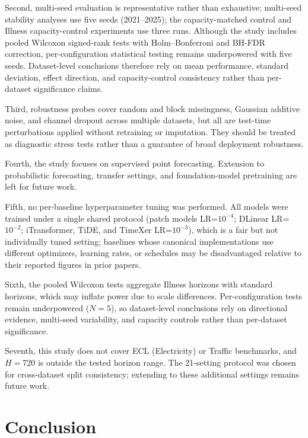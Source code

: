\documentclass{ieeeaccess}
\begin{document}
Second, multi-seed evaluation is representative rather than exhaustive:
multi-seed stability analyses use five seeds (2021--2025); the capacity-matched control
and Illness capacity-control experiments use three runs. Although the study includes
pooled Wilcoxon signed-rank tests with Holm--Bonferroni and BH-FDR correction,
per-configuration statistical testing remains underpowered with five seeds.
Dataset-level conclusions therefore rely on mean performance, standard deviation,
effect direction, and capacity-control consistency rather than per-dataset
significance claims.

Third, robustness probes cover random and block missingness, Gaussian additive noise,
and channel dropout across multiple datasets, but all are test-time perturbations
applied without retraining or imputation. They should be treated as diagnostic stress
tests rather than a guarantee of broad deployment robustness.

Fourth, the study focuses on supervised point forecasting. Extension to probabilistic
forecasting, transfer settings, and foundation-model pretraining are left for future
work.

Fifth, no per-baseline hyperparameter tuning was performed. All models were trained
under a single shared protocol (patch models LR=$10^{-4}$; DLinear LR=$10^{-2}$;
iTransformer, TiDE, and TimeXer LR=$10^{-3}$), which is a fair but not individually
tuned setting; baselines whose canonical implementations use different optimizers,
learning rates, or schedules may be disadvantaged relative to their reported figures
in prior papers.

Sixth, the pooled Wilcoxon tests aggregate Illness horizons with standard horizons,
which may inflate power due to scale differences. Per-configuration tests remain
underpowered ($N=5$), so dataset-level conclusions rely on directional evidence,
multi-seed variability, and capacity controls rather than per-dataset significance.

Seventh, this study does not cover ECL (Electricity) or Traffic benchmarks, and
$H=720$ is outside the tested horizon range. The 21-setting protocol was chosen for
cross-dataset split consistency; extending to these additional settings remains
future work.

\section{Conclusion}
\end{document}
